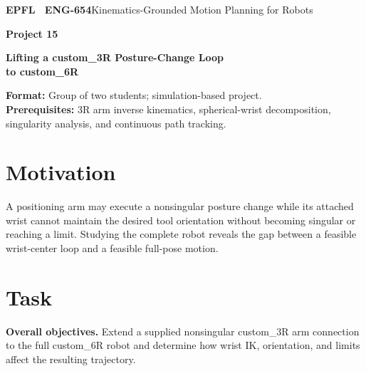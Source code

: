 \documentclass[11pt,a4paper]{article}
\begin{document}
{\small\textbf{EPFL \textbar\ ENG-654}\hfill Kinematics-Grounded Motion Planning for Robots}
\vspace{5mm}

{\color{epflred}\Large\bfseries Project 15}

{\LARGE\bfseries Lifting a custom\_3R Posture-Change Loop\\to custom\_6R\par}

\textbf{Format:} Group of two students; simulation-based project.\\
\textbf{Prerequisites:} 3R arm inverse kinematics, spherical-wrist decomposition, singularity analysis, and continuous path tracking.

\section*{Motivation}
A positioning arm may execute a nonsingular posture change while its
attached wrist cannot maintain the desired tool orientation without becoming
singular or reaching a limit. Studying the complete robot reveals the gap
between a feasible wrist-center loop and a feasible full-pose motion.

\section*{Task}
\textbf{Overall objectives.} Extend a supplied nonsingular custom\_3R arm connection to the full
custom\_6R robot and determine how wrist IK, orientation, and limits affect
the resulting trajectory.
\end{document}
